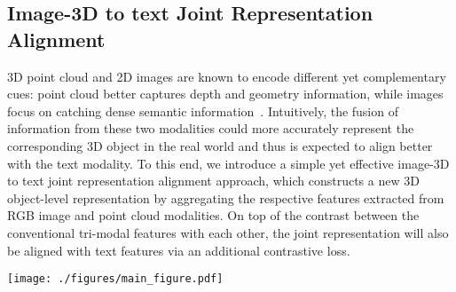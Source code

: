 \documentclass{article} \usepackage{iclr2024_conference,times}
\newcommand{\ourmethod}{MixCon3D}
\begin{document}
\subsection{Image-3D to text Joint Representation Alignment}
\label{subsec:joint_modal}
3D point cloud and 2D images are known to encode different yet complementary cues: point cloud better captures depth and geometry information, while images focus on catching dense semantic information~\citep{bai2022transfusion,liu2023bevfusion,chen2023bevdistill,Wang2023distillbev}. 
Intuitively, the fusion of information from these two modalities could more accurately represent the corresponding 3D object in the real world and thus is expected to align better with the text modality.
To this end, we introduce a simple yet effective image-3D to text joint representation alignment approach, which constructs a new 3D object-level representation by aggregating the respective features extracted from RGB image and point cloud modalities.
On top of the contrast between the conventional tri-modal features with each other, the joint representation will also be aligned with text features via an additional contrastive loss.

\begin{figure*}[!t]
  \centering
  \texttt{[image: ./figures/main\_figure.pdf]}
  \vspace{-1.5em}
   \caption{Summary of our \ourmethod~framework. \ourmethod~first extracts the representation of input triplets (images, text, point cloud) from a pre-trained vision-language model (\textit{e.g.}, CLIP) and a 3D encoder (\textit{e.g.}, PointBERT). Then, the image and point cloud features go through a projector to obtain the joint modal features, serving as complementary representations. The contrastive losses are applied to align features among three modalities (image-text-3D) and joint representation to text.}
   \label{fig:method}
\end{figure*}
\end{document}
